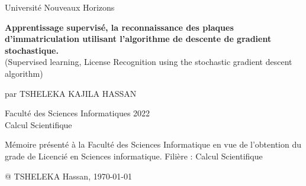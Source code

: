 \sloppy
\begin{titlepage}
  \begin{singlespace}
\begin{center}
{Université Nouveaux Horizons} \vspace{1.5 cm}\\
\end{center}

\begin{center}

\Large{{\bf{Apprentissage supervisé, la reconnaissance des plaques d'immatriculation utilisant l'algorithme de descente de gradient stochastique.}}
	\\ (Supervised learning, License Recognition using the stochastic gradient descent algorithm)}


\end{center}
\vspace{1.5 cm}
\begin{center}
	\normalsize{par TSHELEKA KAJILA HASSAN}
	\vspace{1.5 cm}
\end{center}

\begin{center}
Faculté des Sciences Informatiques 2022\\
Calcul Scientifique
\end{center}
\vspace{1.5 cm}

\begin{center}
Mémoire présenté à la Faculté des Sciences Informatique en vue de l'obtention du grade de Licencié en 
Sciences informatique. Filière : Calcul Scientifique
\end{center}
\vspace{1.5 cm} 






\begin{center}
\vspace{3 cm}
@ TSHELEKA Hassan, \today
\end{center}
  \end{singlespace}

  \newpage
\end{titlepage} 